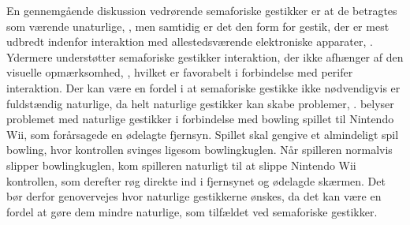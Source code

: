 En gennemgående diskussion vedrørende semaforiske gestikker er at de betragtes som værende unaturlige, \parencite[s. 1961]{PDF:AStudyOnTheUseOfSemaphoricGestures}, men samtidig er det den form for gestik, der er mest udbredt indenfor interaktion med allestedsværende elektroniske apparater, \parencite[s. 28]{PDF:ATaxonomyOfGestures}. Ydermere understøtter semaforiske gestikker interaktion, der ikke afhænger af den visuelle opmærksomhed, \parencite[s. 1964]{PDF:AStudyOnTheUseOfSemaphoricGestures}, hvilket er favorabelt i forbindelse med perifer interaktion. Der kan være en fordel i at semaforiske gestikke ikke nødvendigvis er fuldstændig naturlige, da helt naturlige gestikker kan skabe problemer, \parencite[s. 9]{PDF:NaturalUserInterfaces}. \textcite[s. 9]{PDF:NaturalUserInterfaces} belyser problemet med naturlige gestikker i forbindelse med bowling spillet til Nintendo Wii, som forårsagede en ødelagte fjernsyn. Spillet skal gengive et almindeligt spil bowling, hvor kontrollen svinges ligesom bowlingkuglen. Når spilleren normalvis slipper bowlingkuglen, kom spilleren naturligt til at slippe Nintendo Wii kontrollen, som derefter røg direkte ind i fjernsynet og ødelagde skærmen. Det bør derfor genovervejes hvor naturlige gestikkerne ønskes, da det kan være en fordel at gøre dem mindre naturlige, som tilfældet ved semaforiske gestikker.
%
